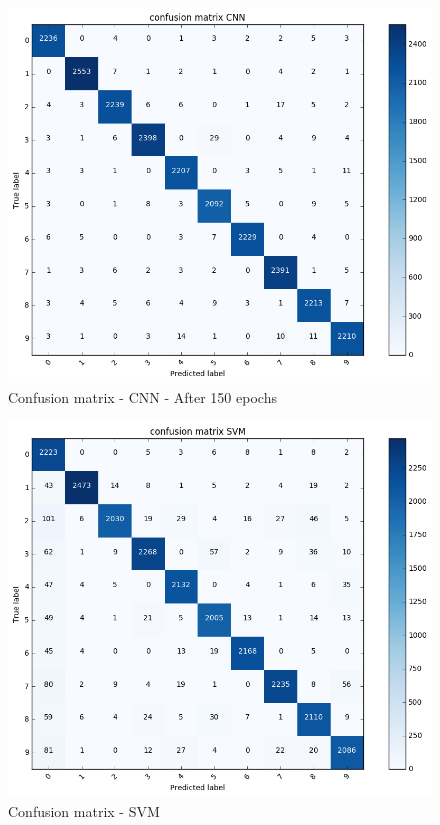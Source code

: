 \documentclass[paper=a4, fontsize=11pt]{scrartcl} %
\begin{document}
    \begin{figure}[H]
        \begin{center}
            \includegraphics[width=1.0\linewidth]{images/confusion_matrix_CNN}
            \caption{Confusion matrix - CNN - After 150 epochs}
            \label{fig:con_mat_CNN}
        \end{center}
    \end{figure}
    
    \begin{figure}[H]
        \begin{center}
            \includegraphics[width=1.0\linewidth]{images/confusion_matrix_SVM}
            \caption{Confusion matrix - SVM}
            \label{fig:con_mat_SVM}
        \end{center}
    \end{figure} 
   		
\end{document}
